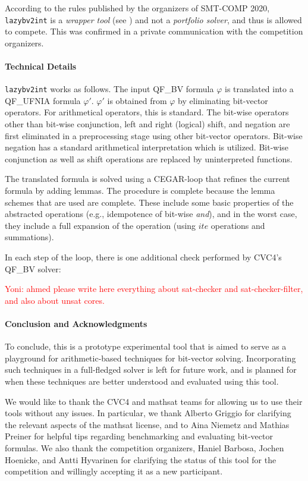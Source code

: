 \documentclass{easychair}
\newcommand{\comment}[3]{\begin{mdframed}{{\textcolor{#1}{#2: #3}}}\end{mdframed}}
\newcommand{\yoni}[1]{\comment{red}{Yoni}{#1}}
\newcommand{\lazybvtoint}{\texttt{lazybv2int}\xspace}
\newcommand{\smtcomp}{SMT-COMP\xspace}
\newcommand{\qfbv}{QF\_BV\xspace}
\newcommand{\qfufnia}{QF\_UFNIA\xspace}
\newcommand{\msat}{mathsat\xspace}
\newcommand{\cvcfour}{CVC4\xspace}
\begin{document}
According to the rules published by the organizers
of \smtcomp 2020, \lazybvtoint is a {\em wrapper tool} (see \cite{rules20})
and not a {\em portfolio solver},
and thus is allowed to compete.
This was confirmed in a private communication with the competition organizers.

\paragraph{Technical Details}
\lazybvtoint works as follows.
The input \qfbv formula $\varphi$ is translated into a
\qfufnia formula $\varphi'$.
$\varphi'$ is obtained from $\varphi$ by eliminating
bit-vector operators.
For arithmetical operators, this is standard.
The bit-wise operators other than bit-wise conjunction, left
and right (logical) shift, and negation are first
eliminated in a preprocessing stage using other bit-vector operators.
Bit-wise negation has a standard arithmetical interpretation which is utilized.
Bit-wise conjunction as well as shift operations are replaced by uninterpreted functions.

The translated formula is solved using a CEGAR-loop that refines the current formula by adding lemmas.
The procedure is complete because the lemma schemes that are used are complete.
%
These include some basic properties of the abstracted operations
(e.g., idempotence of bit-wise \emph{and}), and in the worst case,
they include a full expansion of the operation (using
$ite$ operations and summations).

In each step of the loop, there is one additional check performed by \cvcfour's \qfbv solver:
\yoni{ahmed please write here everything about sat-checker and sat-checker-filter, and also about unsat cores.}


\paragraph{Conclusion and Acknowledgments}
To conclude, this is a prototype experimental tool that is aimed
to serve as a playground for arithmetic-based techniques
for bit-vector solving.
Incorporating such techniques in a full-fledged solver is left for future work,
and is planned for when these techniques are better
understood and evaluated using this tool.

We would like to thank the \cvcfour and \msat teams for allowing us
to use their tools without any issues.
In particular, we thank Alberto Griggio for clarifying
the relevant aspects of the \msat license,
and to Aina Niemetz and Mathias Preiner for helpful tips
regarding benchmarking and evaluating bit-vector formulas.
We also thank the competition organizers,
Haniel Barbosa, Jochen Hoenicke, and
Antti Hyvarinen for clarifying the status of this tool for the competition and willingly accepting it as a new participant.



  
  
\end{document}
